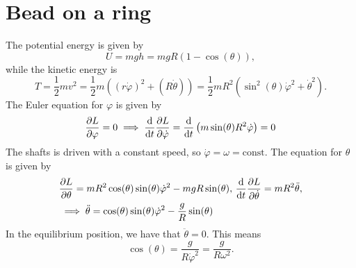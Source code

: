 \documentclass{article}
\begin{document}
    \section{Bead on a ring}
        The potential energy is given by
        \begin{equation*}
            U = mgh = mgR(1 - \cos(\theta)),
        \end{equation*}
        while the kinetic energy is
        \begin{equation*}
            T = \frac{1}{2}m v^2 = \frac{1}{2}m \left((r \dot \varphi)^2 + (R \dot \theta)\right) = \frac{1}{2}m R^2\left(\sin^2(\theta) \dot \varphi^2 + \dot\theta^2\right).
        \end{equation*}
        The Euler equation for $\varphi$ is given by
        \begin{equation*}
            \pdv{L}{\varphi} = 0 \implies \dv{t}\pdv{L}{\dot \varphi} = \dv{t}\left(m \sin(\theta)R^2 \dot \varphi\right) = 0
        \end{equation*}
        The shafts is driven with a constant speed, so $\dot \varphi = \omega = \mathrm{const.}$ The equation for $\theta$ is given by
        \begin{align*}
            &\pdv{L}{\theta} = m R^2 \cos(\theta) \sin(\theta) \dot \varphi^2 - mgR \sin(\theta), \, \dv{t} \pdv{L}{\dot \theta} = m R^2 \ddot \theta, \\
            & \implies \ddot \theta = \cos(\theta) \sin(\theta) \dot \varphi^2  - \frac{g}{R}\sin(\theta) 
        \end{align*}
        In the equilibrium position, we have that $\ddot \theta = 0$. This means
        \begin{equation*}
            \cos(\theta) = \frac{g }{R\dot \varphi^2} = \frac{g }{R\omega^2}.
        \end{equation*}
\end{document}
